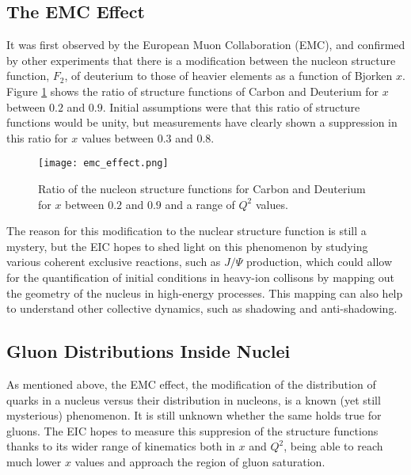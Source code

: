 \subsection{The EMC Effect}
It was first observed by the European Muon Collaboration (EMC), and confirmed by other experiments  that there is a modification between the nucleon structure function, $F_2$, of deuterium to those of heavier elements as a function of Bjorken $x$. Figure \ref{fig:emc_effect} shows the ratio of structure functions of Carbon and Deuterium for $x$ between $0.2$ and $0.9$. Initial assumptions were that this ratio of structure functions would be unity, but measurements have clearly shown a suppression in this ratio for $x$ values between $0.3$ and $0.8$.

\begin{figure}[ht]
	\centering
	\texttt{[image: emc\_effect.png]}
	\caption{Ratio of the nucleon structure functions for Carbon and Deuterium for $x$ between $0.2$ and $0.9$ and a range of $Q^2$ values.}
	\label{fig:emc_effect}
\end{figure}

The reason for this modification to the nuclear structure function is still a mystery, but the EIC hopes to shed light on this phenomenon by studying various coherent exclusive reactions, such as $J/\Psi$ production, which could allow for the quantification of initial conditions in heavy-ion collisons by mapping out the geometry of the nucleus in high-energy processes. This mapping can also help to understand other collective dynamics, such as shadowing and anti-shadowing.

\subsection{Gluon Distributions Inside Nuclei}
As mentioned above, the EMC effect, the modification of the distribution of quarks in a nucleus versus their distribution in nucleons, is a known (yet still mysterious) phenomenon. It is still unknown whether the same holds true for gluons. The EIC hopes to measure this suppresion of the structure functions thanks to its wider range of kinematics both in $x$ and $Q^2$, being able to reach much lower $x$ values and approach the region of gluon saturation. 

